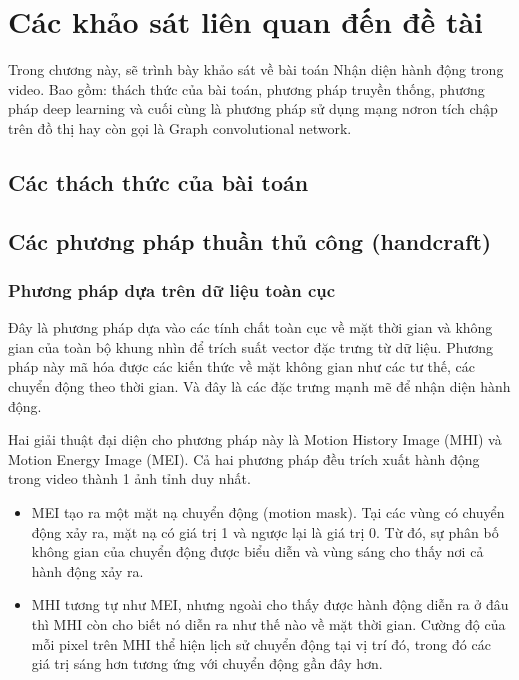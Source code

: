 \section{Các khảo sát liên quan đến đề tài}

Trong chương này, sẽ trình bày khảo sát về bài toán Nhận diện hành động trong video. Bao gồm: thách thức của bài toán, phương pháp truyền thống, phương pháp deep learning và cuối cùng là phương pháp sử dụng mạng nơron tích chập trên đồ thị hay còn gọi là Graph convolutional network.

\subsection{Các thách thức của bài toán}

\subsection{Các phương pháp thuần thủ công (handcraft)}

\subsubsection{Phương pháp dựa trên dữ liệu toàn cục}

Đây là phương pháp dựa vào các tính chất toàn cục về mặt thời gian và không gian của toàn bộ khung nhìn để trích suất vector đặc trưng từ dữ liệu. Phương pháp này mã hóa được các kiến thức về mặt không gian như các tư thế, các chuyển động theo thời gian. Và đây là các đặc trưng mạnh mẽ để nhận diện hành động.

Hai giải thuật đại diện cho phương pháp này là Motion History Image (MHI) và Motion Energy Image (MEI). Cả hai phương pháp đều trích xuất hành động trong video thành 1 ảnh tỉnh duy nhất.

\begin{itemize}
    \item MEI tạo ra một mặt nạ chuyển động (motion mask). Tại các vùng có chuyển động xảy ra, mặt nạ có giá trị 1 và ngược lại là giá trị 0. Từ đó, sự phân bố không gian của chuyển động được biểu diễn và vùng sáng cho thấy nơi cả hành động xảy ra.
    \item MHI tương tự như MEI, nhưng ngoài cho thấy được hành động diễn ra ở đâu thì MHI còn cho biết nó diễn ra như thế nào về mặt thời gian. Cường độ của mỗi pixel trên MHI thể hiện lịch sử chuyển động tại vị trí đó, trong đó các giá trị sáng hơn tương ứng với chuyển động gần đây hơn.
\end{itemize}

